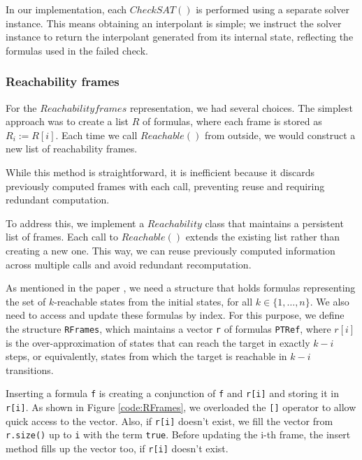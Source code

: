 In our implementation, each \( CheckSAT() \) is performed using a separate
solver instance. This means obtaining an interpolant is simple; we instruct the
solver instance to return the interpolant generated from its internal state,
reflecting the formulas used in the failed check.

\subsubsection*{Reachability frames}
\noindent For the \( Reachability frames \) representation, we had several
choices. The simplest approach was to create a list $R$ of formulas, where each
frame is stored as $R_i := R[i]$. Each time we call \( Reachable() \) from
outside, we would construct a new list of reachability frames.

While this method is straightforward, it is inefficient because it discards
previously computed frames with each call, preventing reuse and requiring
redundant computation. 

To address this, we implement a \( Reachability \) class that maintains a
persistent list of frames. Each call to \( Reachable() \) extends the existing
list rather than creating a new one. This way, we can reuse previously computed
information across multiple calls and avoid redundant recomputation.

As mentioned in the paper \cite{7886665}, we need a structure that holds
formulas representing the set of $k$-reachable states from the initial states,
for all $k \in \{1, \dots, n\}$. We also need to access and update these
formulas by index. For this purpose, we define the structure \texttt{RFrames},
which maintains a vector \texttt{r} of formulas \texttt{PTRef}, where $r[i]$ is
the over-approximation of states that can reach the target in exactly $k - i$
steps, or equivalently, states from which the target is reachable in $k - i$
transitions.

Inserting a formula \texttt{f} is creating a conjunction of \texttt{f} and
\texttt{r[i]} and storing it in \texttt{r[i]}. As shown in Figure
\ref{code:RFrames}, we overloaded the \texttt{[]}
operator to allow quick access to the vector. Also, if \texttt{r[i]} doesn't
exist, we fill the vector from \texttt{r.size()} up to \texttt{i} with the term
\texttt{true}. Before updating the i-th frame, the insert method fills up the
vector too, if \texttt{r[i]} doesn't exist.

